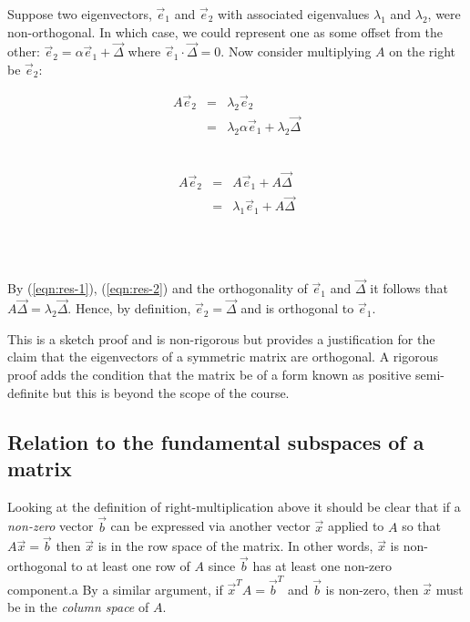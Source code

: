 \documentclass[a4paper]{article}
\newcommand{\highlight}[1]{{\color{blue}#1}}
\begin{document}
Suppose two eigenvectors, $\vec{e}_1$ and $\vec{e}_2$ with associated
eigenvalues $\lambda_1$ and $\lambda_2$, were non-orthogonal. In which case, we
could represent one as some offset from the other: $\vec{e}_2 = \alpha \vec{e}_1
+ \vec{\Delta}$ where $\vec{e}_1 \cdot \vec{\Delta} = 0$.  Now consider
multiplying $A$ on the right be $\vec{e}_2$:

\begin{centering}
\parbox{0.3\columnwidth}{\centering
\begin{eqnarray}
  A \vec{e}_2 &=& \lambda_2 \vec{e}_2 \nonumber \\
  &=& \lambda_2 \alpha \vec{e}_1 + \lambda_2 \vec{\Delta} \label{eqn:res-1}
\end{eqnarray}\\
}\parbox{0.3\columnwidth}{\centering
\begin{eqnarray}
  A \vec{e}_2 &=& A \vec{e}_1 + A \vec{\Delta} \nonumber \\
  &=& \lambda_1 \vec{e}_1 + A \vec{\Delta} \label{eqn:res-2}
\end{eqnarray}\\
}\\
\end{centering}

By (\ref{eqn:res-1}), (\ref{eqn:res-2}) and the orthogonality of $\vec{e}_1$ and
$\vec{\Delta}$ it follows that $A\vec{\Delta} = \lambda_2 \vec{\Delta}$.  Hence,
by definition, $\vec{e}_2 = \vec{\Delta}$ and is orthogonal to $\vec{e}_1$.

This is a sketch proof and is non-rigorous but provides a justification for the
claim that \highlight{the eigenvectors of a symmetric matrix are orthogonal}. A
rigorous proof adds the condition that the matrix be of a form known as positive
semi-definite but this is beyond the scope of the course.

\subsection{Relation to the fundamental subspaces of a matrix}

Looking at the definition of right-multiplication above it should be clear that
if a \emph{non-zero} vector $\vec{b}$ can be expressed via another vector
$\vec{x}$ applied to $A$ so that $A\vec{x} = \vec{b}$ then $\vec{x}$ is in the
row space of the matrix. In other words, $\vec{x}$ is non-orthogonal to at
least one row of $A$ since $\vec{b}$ has at least one non-zero component.a
By a similar argument, if $\vec{x}^T A = \vec{b}^T$ and $\vec{b}$ is non-zero,
then $\vec{x}$ must be in the \emph{column space} of $A$.
\end{document}
